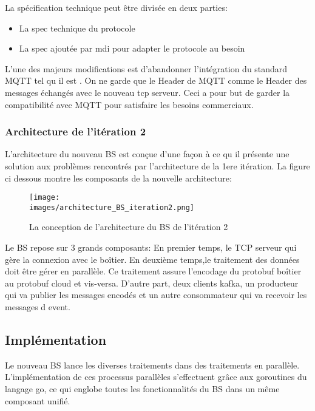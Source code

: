         La spécification technique peut être divisée en deux parties:
        \begin{itemize}
            \renewcommand{\labelitemi}{$\bullet$}
            \item La spec technique du protocole
            \item La spec ajoutée par \gls{mdi} pour adapter le protocole au besoin
        \end{itemize}
        \bigskip
        L’une des majeurs modifications est d'abandonner l’intégration du standard MQTT 
        tel qu il est . On ne garde que le Header de MQTT comme le Header des messages 
        échangés avec le nouveau tcp serveur. Ceci a pour but de garder la compatibilité 
        avec MQTT pour satisfaire les besoins commerciaux. 

        \subsubsection{Architecture de l'itération 2 }
            L’architecture du nouveau BS est conçue d’une façon à ce qu il présente 
            une solution aux problèmes rencontrés par l’architecture de la 1ere itération. 
            La figure ci dessous montre les composants de la nouvelle architecture:  \\
            \begin{figure}[ht]
                \centering
                \texttt{[image: \\images/architecture\_BS\_iteration2.png]}
                \caption{La conception de l'architecture du BS de l'itération 2}
                \label{Figure }
            \end{figure}
        
       
            Le BS  repose sur 3 grands composants: 
            En premier temps, le TCP serveur qui gère la connexion avec le boîtier. 
            En deuxième temps,le traitement des données doit être gérer en parallèle. 
            Ce traitement assure l’encodage du protobuf boîtier au protobuf cloud et 
            vis-versa. 
            D’autre part, deux clients kafka, un producteur qui va publier les messages 
            encodés et un autre consommateur qui va recevoir les messages d event. 

            \subsection{Implémentation}
            Le nouveau BS lance les diverses traitements dans des traitements en 
            parallèle. L’implémentation de ces processus parallèles s’effectuent grâce 
            aux goroutines du langage go, ce qui englobe toutes les fonctionnalités du BS 
            dans un même composant unifié.

